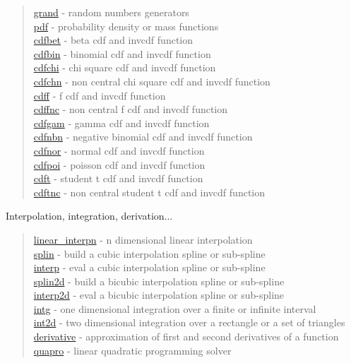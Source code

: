 \begin{quote}
\noindent
\hyperlink{grand}{grand} - random numbers generators \\
\hyperlink{pdf}{pdf} - probability density or mass functions \\
\hyperlink{cdfbet}{cdfbet} - beta cdf and invcdf function \\
\hyperlink{cdfbin}{cdfbin} - binomial cdf and invcdf function \\
\hyperlink{cdfchi}{cdfchi} - chi square cdf and invcdf function \\
\hyperlink{cdfchn}{cdfchn} - non central chi square cdf and invcdf function \\
\hyperlink{cdff}{cdff} - f cdf and invcdf function \\
\hyperlink{cdffnc}{cdffnc} - non central f cdf and invcdf function \\
\hyperlink{cdfgam}{cdfgam} - gamma cdf and invcdf function \\
\hyperlink{cdfnbn}{cdfnbn} - negative binomial cdf and invcdf function \\
\hyperlink{cdfnor}{cdfnor} - normal cdf and invcdf function \\
\hyperlink{cdfpoi}{cdfpoi} - poisson cdf and invcdf function \\
\hyperlink{cdft}{cdft} - student t cdf and invcdf function \\
\hyperlink{cdftnc}{cdftnc} - non central student t cdf and invcdf function \\
\end{quote}

Interpolation, integration, derivation...

\begin{quote}
\noindent
\hyperlink{linear_interpn}{linear\_interpn} - n dimensional linear interpolation \\
\hyperlink{splin}{splin} - build a cubic interpolation spline or sub-spline \\
\hyperlink{interp}{interp} - eval a cubic interpolation spline or sub-spline \\
\hyperlink{splin2d}{splin2d} - build a bicubic interpolation spline or sub-spline \\
\hyperlink{interp2d}{interp2d} - eval a bicubic interpolation spline or sub-spline \\
\hyperlink{intg}{intg} - one dimensional integration over a finite or infinite interval \\
\hyperlink{int2d}{int2d} - two dimensional integration over a rectangle or a set of triangles \\
\hyperlink{derivative}{derivative} - approximation of first and second derivatives of a function\\
\hyperlink{quapro}{quapro} - linear quadratic programming solver \\
\end{quote}

